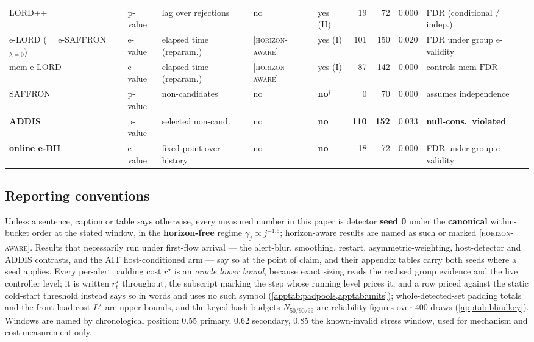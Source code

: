 \documentclass[conference]{IEEEtran}
\newcommand{\FDR}{\mathrm{FDR}}
\newcommand{\oracle}{\textsc{[horizon-aware]}}
\begin{document}
\begin{table}[t]
{\begin{tabular}{lllllrrrl}
LORD++~\cite{ramdas2017lordpp}     & p-value & lag over rejections & no & yes (II) & 19 & 72 & 0.000 & FDR (conditional / indep.) \\
e-LORD ($=$e-SAFFRON$_{\lambda{=}0}$)~\cite{egai2025} & e-value & elapsed time (reparam.) & \oracle & yes (I) & 101 & 150 & 0.020 & FDR under group e-validity \\
mem-e-LORD~\cite{egai2025}         & e-value & elapsed time (reparam.) & \oracle & yes (I) & 87 & 142 & 0.000 & controls mem-$\FDR$ \\
SAFFRON~\cite{ramdas2018saffron}   & p-value & non-candidates & no & \textbf{no}$^\dagger$ & 0 & 70 & 0.000 & assumes independence \\
\textbf{ADDIS}~\cite{tian2019addis}& p-value & selected non-cand.\ & no & \textbf{no} & \textbf{110} & \textbf{152} & 0.033 & \textbf{null-cons.\ violated} \\
\textbf{online e-BH}~\cite{xu2024elond} & e-value & fixed point over history & no & \textbf{no} & 18 & 72 & 0.000 & FDR under group e-validity \\
\bottomrule
\end{tabular}}
\end{table}

\subsection{Reporting conventions}\label{app:conventions}

Unless a sentence, caption or table says otherwise, every measured number in this paper is detector
\textbf{seed 0} under the \textbf{canonical} within-bucket order at the stated window, in the
\textbf{horizon-free} regime $\gamma_j\propto j^{-1.6}$; horizon-aware results are named as such or
marked \oracle. Results that
necessarily run under first-flow arrival --- the alert-blur, smoothing, restart, asymmetric-weighting,
host-detector and ADDIS contrasts, and the AIT host-conditioned arm --- say so at the point of claim,
and their appendix tables carry both seeds where a seed applies. Every per-alert padding cost
$r^{\star}$ is an \emph{oracle lower bound}, because exact sizing reads the realised group evidence and
the live controller level; it is written $r^{\star}_t$ throughout, the subscript marking the step whose
running level prices it, and a row priced against the static cold-start threshold instead says so in
words and uses no such symbol (\cref{apptab:padpools,apptab:units}); whole-detected-set padding totals and the front-load cost $L^{\star}$ are
upper bounds, and the keyed-hash budgets $N_{50/90/99}$ are reliability figures over 400 draws
(\cref{apptab:blindkey}). Windows are named by chronological position: 0.55 primary, 0.62 secondary, 0.85 the
known-invalid stress window, used for mechanism and cost measurement only.
\end{document}
